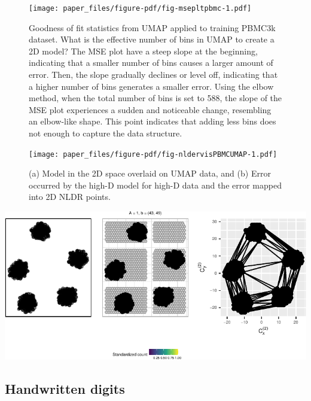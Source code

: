 \documentclass[
  12pt]{article}
\begin{document}
\begin{figure}[H]

{\centering \texttt{[image: paper\_files/figure-pdf/fig-msepltpbmc-1.pdf]}

}

\caption{\label{fig-msepltpbmc}Goodness of fit statistics from UMAP
applied to training PBMC3k dataset. What is the effective number of bins
in UMAP to create a 2D model? The MSE plot have a steep slope at the
beginning, indicating that a smaller number of bins causes a larger
amount of error. Then, the slope gradually declines or level off,
indicating that a higher number of bins generates a smaller error. Using
the elbow method, when the total number of bins is set to 588, the slope
of the MSE plot experiences a sudden and noticeable change, resembling
an elbow-like shape. This point indicates that adding less bins does not
enough to capture the data structure.}

\end{figure}

\begin{figure}[H]

{\centering \texttt{[image: paper\_files/figure-pdf/fig-nldervisPBMCUMAP-1.pdf]}

}

\caption{\label{fig-nldervisPBMCUMAP}(a) Model in the 2D space overlaid
on UMAP data, and (b) Error occurred by the high-D model for high-D data
and the error mapped into 2D NLDR points.}

\end{figure}

\includegraphics{paper_files/figure-pdf/unnamed-chunk-72-1.pdf}

\hypertarget{handwritten-digits}{%
\subsection{Handwritten digits}\label{handwritten-digits}}
\end{document}
